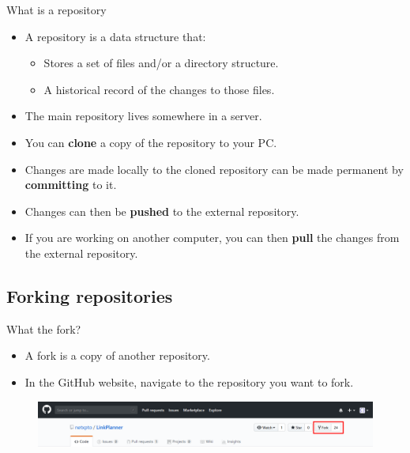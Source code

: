 \documentclass[usenames,dvipsnames,aspectratio=169]{beamer}
\newcommand{\aitem}{\item[$\cdot$]}
\newcommand{\bitem}{\item[-]}
\begin{document}
\begin{frame}[t]{What is a repository}
\begin{itemize}
\aitem A repository is a data structure that:
\begin{itemize}
\bitem Stores a set of files and/or a directory structure.
\bitem A historical record of the changes to those files.
\end{itemize}
\aitem The main repository lives somewhere in a server.
\aitem You can \textbf{clone} a copy of the repository to your PC.
\aitem Changes are made locally to the cloned repository can be made permanent by \textbf{committing} to it.
\aitem Changes can then be \textbf{pushed} to the external repository.
\aitem If you are working on another computer, you can then \textbf{pull} the changes from the external repository.
\end{itemize}
\end{frame}


\subsection{Forking repositories}
\begin{frame}[t]{What the fork?}
\begin{itemize}
\aitem A fork is a copy of another repository.
\aitem In the GitHub website, navigate to the repository you want to fork.
\end{itemize}
\begin{figure}
\centering
\includegraphics[width=\linewidth]{forking1}
\end{figure}
\end{frame}

\end{document}
